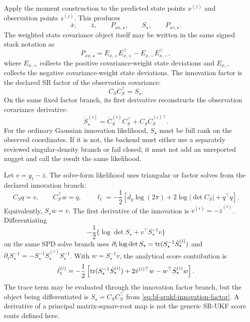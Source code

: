 Apply the moment construction to the predicted state points \(x^{(j)}\) and
observation points \(z^{(j)}\).  This produces
\[
  \bar x,\qquad
  \bar z,\qquad
  P_{xx,\star},\qquad
  S_\star,\qquad
  P_{xz,\star}.
\]
The weighted state covariance object itself may be written in the same signed
stack notation as
\begin{equation}
\label{eq:bf-srukf-state-signed-covariance-stack}
  P_{xx,\star}=E_{x,+}E_{x,+}^\top-E_{x,-}E_{x,-}^\top,
\end{equation}
where \(E_{x,+}\) collects the positive covariance-weight state deviations and
\(E_{x,-}\) collects the negative covariance-weight state deviations.  The
innovation factor is the declared SR factor of the observation covariance:
\begin{equation}
\label{eq:bf-srukf-innovation-factor}
  C_S C_S^\top=S_\star .
\end{equation}
On the same fixed factor branch, its first derivative reconstructs the
observation covariance derivative:
\begin{equation}
\label{eq:bf-srukf-innovation-factor-first}
  \dot S_\star^{(i)}
  =
  \dot C_S^{(i)}C_S^\top+C_S\dot C_S^{(i)\top}.
\end{equation}
For the ordinary Gaussian innovation likelihood, \(S_\star\) must be full rank
on the observed coordinates.  If it is not, the backend must either use a
separately reviewed singular-density branch or fail closed; it must not add an
unreported nugget and call the result the same likelihood.

Let \(v=y_t-\bar z\).  The solve-form likelihood uses triangular or factor
solves from the declared innovation branch:
\begin{equation}
\label{eq:bf-srukf-loglik-solve}
  C_S q=v,\qquad C_S^\top w=q,\qquad
  \ell_t
  =
  -\frac12
  \left[
    d_y\log(2\pi)+2\log|\det C_S|+q^\top q
  \right].
\end{equation}
Equivalently, \(S_\star w=v\).  The first derivative of the innovation is
\(\dot v^{(i)}=-\dot{\bar z}^{(i)}\).  Differentiating
\[
  -\frac12\{\log\det S_\star+v^\top S_\star^{-1}v\}
\]
on the same SPD solve branch uses
\(\partial_i\log\det S_\star=\operatorname{tr}(S_\star^{-1}\dot S_\star^{(i)})\) and
\(\partial_i S_\star^{-1}
=-S_\star^{-1}\dot S_\star^{(i)}S_\star^{-1}\).  With
\(w=S_\star^{-1}v\), the analytical score contribution is
\begin{equation}
\label{eq:bf-srukf-score-first}
  \dot\ell_t^{(i)}
  =
  -\frac12
  \left[
    \operatorname{tr}(S_\star^{-1}\dot S_\star^{(i)})
    +2\dot v^{(i)\top}w
    -w^\top\dot S_\star^{(i)}w
  \right].
\end{equation}
The trace term may be evaluated through the innovation factor branch, but the
object being differentiated is \(S_\star=C_SC_S^\top\) from
\eqref{eq:bf-srukf-innovation-factor}.  A derivative of a principal
matrix-square-root map is not the generic SR-UKF score route defined here.

